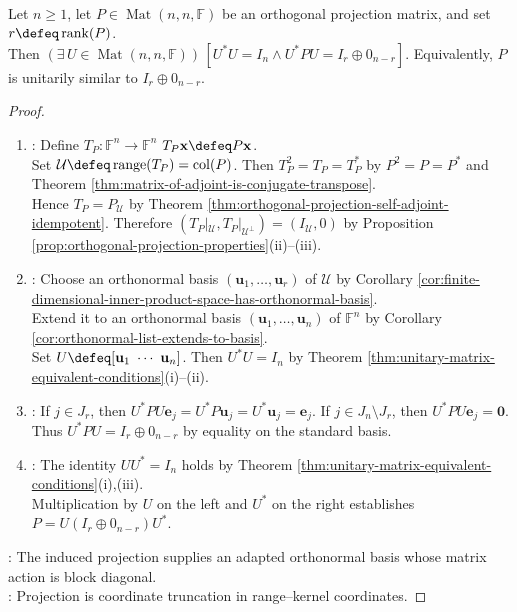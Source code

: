 \begin{theorem} \label{thm:orthogonal-projection-matrix-unitary-coordinate-form} \\
Let $n\geq1$, let $P\in\operatorname{Mat}(n,n,\mathbb{F})$ be an orthogonal projection matrix, and set $r\defeq\operatorname{rank}(P)$.\\
Then $(\exists\,U\in\operatorname{Mat}(n,n,\mathbb{F}))\,[U^*U=I_n\land U^*PU=I_r\oplus0_{n-r}]$. Equivalently, $P$ is unitarily similar to $I_r\oplus0_{n-r}$.
\begin{proof}
\begin{enumerate}[label=(\roman*)]
\setlength{\itemsep}{0pt}
\item {}: Define $T_P:\mathbb{F}^n\to\mathbb{F}^n$  $T_P\mathbf{x}\defeq P\mathbf{x}$.\\
Set $\mathcal{U}\defeq\operatorname{range}(T_P)=\operatorname{col}(P)$. Then $T_P^2=T_P=T_P^*$ by $P^2=P=P^*$ and Theorem \ref{thm:matrix-of-adjoint-is-conjugate-transpose}.\\
Hence $T_P=P_{\mathcal{U}}$ by Theorem \ref{thm:orthogonal-projection-self-adjoint-idempotent}. Therefore $(T_P|_{\mathcal{U}},T_P|_{\mathcal{U}^{\perp}})=(I_{\mathcal{U}},0)$ by Proposition \ref{prop:orthogonal-projection-properties}(ii)--(iii).
\item {}: Choose an orthonormal basis $(\mathbf{u}_1,\ldots,\mathbf{u}_r)$ of $\mathcal{U}$ by Corollary \ref{cor:finite-dimensional-inner-product-space-has-orthonormal-basis}.\\
Extend it to an orthonormal basis $(\mathbf{u}_1,\ldots,\mathbf{u}_n)$ of $\mathbb{F}^n$ by Corollary \ref{cor:orthonormal-list-extends-to-basis}.\\
Set $U\defeq[\mathbf{u}_1\ \cdots\ \mathbf{u}_n]$. Then $U^*U=I_n$ by Theorem \ref{thm:unitary-matrix-equivalent-conditions}(i)--(ii).
\item {}: If $j\in J_r$, then $U^*PU\mathbf{e}_j=U^*P\mathbf{u}_j=U^*\mathbf{u}_j=\mathbf{e}_j$. If $j\in J_n\setminus J_r$, then $U^*PU\mathbf{e}_j=\mathbf{0}$.\\
Thus $U^*PU=I_r\oplus0_{n-r}$ by equality on the standard basis.
\item {}: The identity $UU^*=I_n$ holds by Theorem \ref{thm:unitary-matrix-equivalent-conditions}(i),(iii).\\
Multiplication by $U$ on the left and $U^*$ on the right establishes $P=U(I_r\oplus0_{n-r})U^*$.
\end{enumerate}
: The induced projection supplies an adapted orthonormal basis whose matrix action is block diagonal.\\
: Projection is coordinate truncation in range--kernel coordinates.
\end{proof}
\end{theorem}

